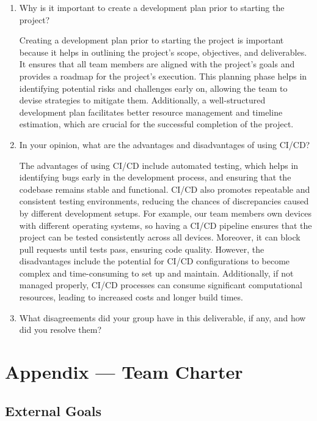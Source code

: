 \documentclass{article}
\begin{document}
\begin{enumerate}
    \item Why is it important to create a development plan prior to starting the project?

    Creating a development plan prior to starting the project is important because it helps in outlining the project's scope, objectives, and deliverables. It ensures that all team members are aligned with the project's goals and provides a roadmap for the project's execution. This planning phase helps in identifying potential risks and challenges early on, allowing the team to devise strategies to mitigate them. Additionally, a well-structured development plan facilitates better resource management and timeline estimation, which are crucial for the successful completion of the project.
    
    \item In your opinion, what are the advantages and disadvantages of using CI/CD?
    
    The advantages of using CI/CD include automated testing, which helps in identifying bugs early in the development process, and ensuring that the codebase remains stable and functional. CI/CD also promotes repeatable and consistent testing environments, reducing the chances of discrepancies caused by different development setups. For example, our team members own devices with different operating systems, so having a CI/CD pipeline ensures that the project can be tested consistently across all devices. Moreover, it can block pull requests until tests pass, ensuring code quality. However, the disadvantages include the potential for CI/CD configurations to become complex and time-consuming to set up and maintain. Additionally, if not managed properly, CI/CD processes can consume significant computational resources, leading to increased costs and longer build times. 
    
    \item What disagreements did your group have in this deliverable, if any, and how did you resolve them?
    

\end{enumerate}

\newpage{}

\section*{Appendix --- Team Charter}

\subsection*{External Goals}
\end{document}
